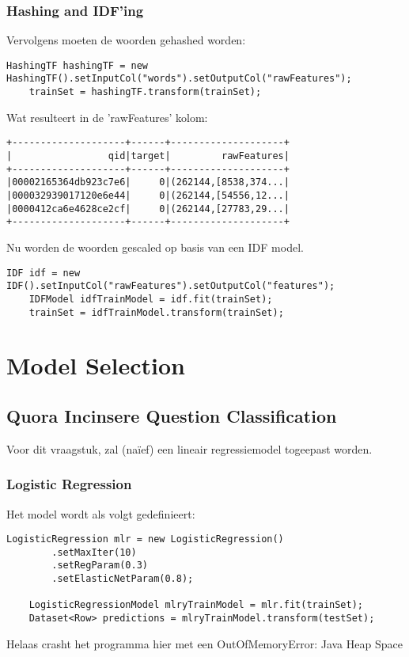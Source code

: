 \subsubsection{Hashing and IDF'ing}
Vervolgens moeten de woorden gehashed worden:
\begin{lstlisting}[style=codeStyle]
    HashingTF hashingTF = new HashingTF().setInputCol("words").setOutputCol("rawFeatures");
    trainSet = hashingTF.transform(trainSet);
\end{lstlisting}
Wat resulteert in de 'rawFeatures' kolom:
\begin{lstlisting}[style=commentStyle]
+--------------------+------+--------------------+
|                 qid|target|         rawFeatures|
+--------------------+------+--------------------+
|00002165364db923c7e6|     0|(262144,[8538,374...|
|000032939017120e6e44|     0|(262144,[54556,12...|
|0000412ca6e4628ce2cf|     0|(262144,[27783,29...|
+--------------------+------+--------------------+
\end{lstlisting}
Nu worden de woorden gescaled op basis van een IDF model.
\begin{lstlisting}[style=codeStyle]
    IDF idf = new IDF().setInputCol("rawFeatures").setOutputCol("features");
    IDFModel idfTrainModel = idf.fit(trainSet);
    trainSet = idfTrainModel.transform(trainSet);
\end{lstlisting}


\section{Model Selection}

\subsection{Quora Incinsere Question Classification}
Voor dit vraagstuk, zal (naïef) een lineair regressiemodel togeepast worden.
\subsubsection{Logistic Regression}
Het model wordt als volgt gedefinieert:
\begin{lstlisting}[style=codeStyle]
	LogisticRegression mlr = new LogisticRegression()
        .setMaxIter(10)
        .setRegParam(0.3)
        .setElasticNetParam(0.8);

    LogisticRegressionModel mlryTrainModel = mlr.fit(trainSet);
    Dataset<Row> predictions = mlryTrainModel.transform(testSet);
\end{lstlisting}
Helaas crasht het programma hier met een OutOfMemoryError: Java Heap Space

